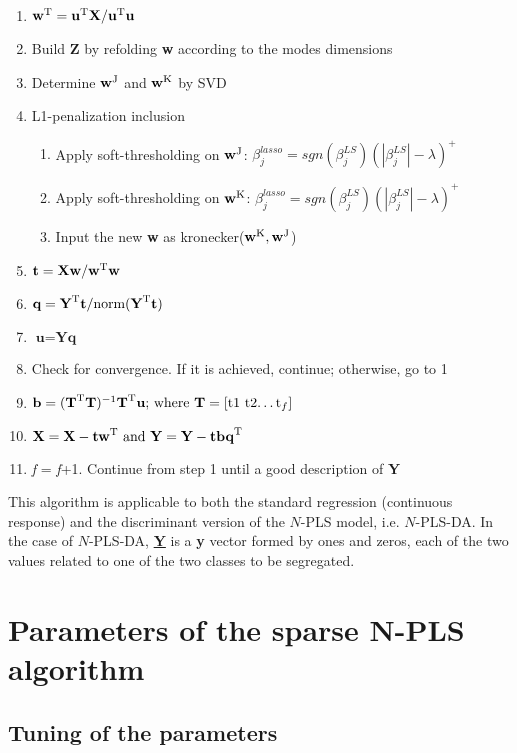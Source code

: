 \begin{enumerate}
    \item $\textbf{\text{w}}^\text{T}=\textbf{\text{u}}^\text{T}\textbf{\text{X}}/\textbf{\text{u}}^\text{T}\textbf{\text{u}}$
    \item Build \textbf{Z} by refolding \textbf{w} according to the modes dimensions
    \item Determine $\textbf{\text{w}}^\text{J}$ and $\textbf{\text{w}}^\text{K}$ by SVD
    \item L1-penalization inclusion
    \begin{enumerate}
        \item Apply soft-thresholding on $\textbf{\text{w}}^\text{J}$: $\beta_j^{lasso}=sgn(\beta_j^{LS})(|\beta_j^{LS}|-\lambda)^+$ 
        \item Apply soft-thresholding on $\textbf{\text{w}}^\text{K}$: $\beta_j^{lasso}=sgn(\beta_j^{LS})(|\beta_j^{LS}|-\lambda)^+$ 
        \item Input the new \textbf{w} as kronecker($\textbf{\text{w}}^\text{K}, \textbf{\text{w}}^\text{J}$)
    \end{enumerate}
    \item $\textbf{\text{t}}=\textbf{\text{Xw}}/\textbf{\text{w}}^\text{T}\textbf{\text{w}}$
    \item $\textbf{\text{q}}=\textbf{\text{Y}}^\text{T}\textbf{\text{t}}/\text{norm}(\textbf{\text{Y}}^\text{T}\textbf{\text{t}})$
    \item $\textbf{u}=\textbf{Yq}$
    \item Check for convergence. If it is achieved, continue; otherwise, go to 1
    \item $\textbf{\text{b}} = (\textbf{\text{T}}^\text{T}\textbf{\text{T}})^{-1}\textbf{\text{T}}^\text{T}\textbf{\text{u}} \text{; where} \ \textbf{\text{T}}=[\text{t1}\ \text{t2} \text{…} \text{t}_f]$
    \item $\textbf{\text{X}} = \textbf{\text{X}}-\textbf{\text{tw}}^\text{T} \ \text{and} \ \textbf{\text{Y}} = \textbf{\text{Y}}-\textbf{\text{tbq}}^\text{T}$
    \item \textit{f} = \textit{f}+1. Continue from step 1 until a good description of \textbf{Y}
\end{enumerate}
\vspace{20pt}

This algorithm is applicable to both the standard regression (continuous response) and the discriminant version of the $N$-PLS model, i.e. $N$-PLS-DA. In the case of $N$-PLS-DA, \textbf{\underline{Y}} is a \textbf{y} vector formed by ones and zeros, each of the two values related to one of the two classes to be segregated. 



\section{Parameters of the sparse N-PLS algorithm}
\subsection{Tuning of the parameters}